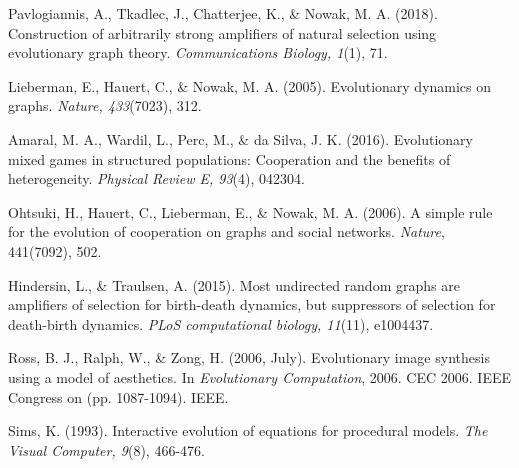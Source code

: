 \documentclass[10pt,a4paper]{article}
\begin{document}
\pagebreak
\begin{thebibliography}{9}

Pavlogiannis, A., Tkadlec, J., Chatterjee, K., \& Nowak, M. A. (2018). Construction of arbitrarily strong amplifiers of natural selection using evolutionary graph theory. \textit{Communications Biology, 1}(1), 71.

Lieberman, E., Hauert, C., \& Nowak, M. A. (2005). Evolutionary dynamics on graphs. \textit{Nature, 433}(7023), 312.

Amaral, M. A., Wardil, L., Perc, M., \& da Silva, J. K. (2016). Evolutionary mixed games in structured populations: Cooperation and the benefits of heterogeneity. 
\textit{Physical Review E, 93}(4), 042304.

Ohtsuki, H., Hauert, C., Lieberman, E., \& Nowak, M. A. (2006). A simple rule for the evolution of cooperation on graphs and social networks. \textit{Nature}, 441(7092), 502.

Hindersin, L., \& Traulsen, A. (2015). Most undirected random graphs are amplifiers of selection for birth-death dynamics, but suppressors of selection for death-birth dynamics.
\textit{PLoS computational biology, 11}(11), e1004437.

Ross, B. J., Ralph, W., \& Zong, H. (2006, July). Evolutionary image synthesis using a model of aesthetics. In \textit{Evolutionary Computation}, 2006. CEC 2006. IEEE Congress on (pp. 1087-1094). IEEE.

Sims, K. (1993). Interactive evolution of equations for procedural models. \textit{The Visual Computer, 9}(8), 466-476.


\end{thebibliography}
\end{document}
